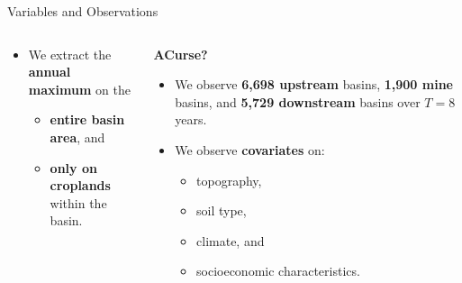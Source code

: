 \documentclass[aspectratio=169,11pt,dvipsnames, handout]{beamer}
\begin{document}
\begin{frame}{Variables and Observations}
\begin{columns}[t]
\begin{column}{0.45\textwidth}
\begin{itemize}
\begin{itemize}
    \item is \textbf{remotely sensed}, and
    \item ranges \textbf{between –1} (water) \textbf{and 1} (dense vegetation).
\end{itemize}
\item We extract the \textbf{annual maximum} on the  
\begin{itemize}
    \item \colorbox{ForestGreen!20}{\textbf{entire basin area}}, and
    \item \colorbox{ForestGreen!20}{\textbf{only on croplands}} within the basin.
\end{itemize} 
\end{itemize}
        \end{column}
        \begin{column}{0.45\textwidth}
            \begin{tcolorbox}[colback=secondclr!20, colframe=secondclr!20, fontupper=\bfseries\color{secondclr!40!black}, width=\textwidth, sharp corners, boxrule=0pt, halign=center]
                \textbf{A\phantom{j}Curse?}
            \end{tcolorbox}
            \vspace{-0.75em}
            \begin{itemize}
                \item We observe \colorbox{upcol!30}{\bfseries 6,698 upstream} basins, \colorbox{gray!30}{\bfseries 1,900 mine} basins, and \colorbox{downcol!30}{\bfseries 5,729 downstream} basins over $T=8$ years. \hyperlink{frame:appbasinno}{} 
                \item We observe \textbf{covariates} on:
    \begin{itemize}
        \item topography,
        \item soil type,
        \item climate, and
        \item socioeconomic characteristics.
    \end{itemize}
        \end{itemize}
        \hyperlink{frame:sumstats}{}
 \centering\hyperlink{frame:covars_balance}{}
        \end{column}
    \end{columns}
\end{frame}
\end{document}
